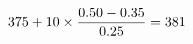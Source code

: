 \documentclass[preview]{standalone}
\begin{document}
\begin{align*}
\special{dvisvgm:raw <g id='unique000'>}375+10\times\frac{0.50-0.35}{0.25}=381\special{dvisvgm:raw </g>}
\end{align*}
\end{document}
